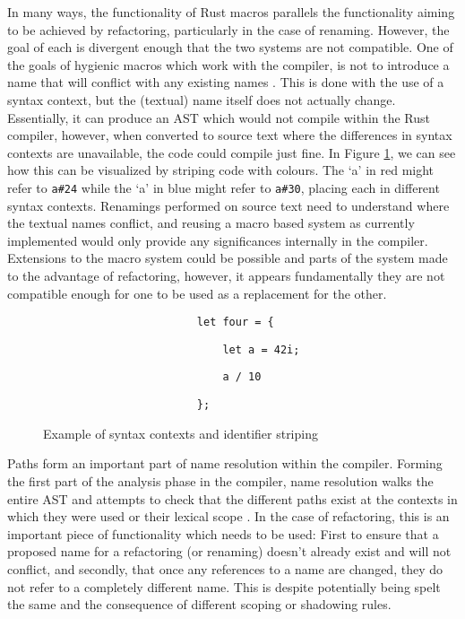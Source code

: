 In many ways, the functionality of Rust macros parallels the functionality aiming to be achieved by refactoring, particularly in the case of renaming. However, the goal of each is divergent enough that the two systems are not compatible. One of the goals of hygienic macros which work with the compiler, is not to introduce a name that will conflict with any existing names \cite{keep15}. This is done with the use of a syntax context, but the (textual) name itself does not actually change. Essentially, it can produce an AST which would not compile within the Rust compiler, however, when converted to source text where the differences in syntax contexts are unavailable, the code could compile just fine. In Figure \ref{Fig:striping}, we can see how this can be visualized by striping code with colours. The `a' in red might refer to {\verb|a#24|} while the `a' in blue might refer to {\verb|a#30|}, placing each in different syntax contexts. Renamings performed on source text need to understand where the textual names conflict, and reusing a macro based system as currently implemented would only provide any significances internally in the compiler. Extensions to the macro system could be possible and parts of the system made to the advantage of refactoring, however, it appears fundamentally they are not compatible enough for one to be used as a replacement for the other.

\begin{figure}[h]
{\color{blue}
\verb|                        let four = {|
}

{\color{red}

\verb|                            let a = 42i;|
}

{
\color{blue}

\verb|                            a / 10|
}

{\color{red}

\verb|                        };|
}

\caption{Example of syntax contexts and identifier striping}
\label{Fig:striping}
\end{figure}

Paths form an important part of name resolution within the compiler. Forming the first part of the analysis phase in the compiler, name resolution walks the entire AST and attempts to check that the different paths exist at the contexts in which they were used or their lexical scope \cite{driver15}. In the case of refactoring, this is an important piece of functionality which needs to be used: First to ensure that a proposed name for a refactoring (or renaming) doesn't already exist and will not conflict, and secondly, that once any references to a name are changed, they do not refer to a completely different name. This is despite potentially being spelt the same and the consequence of different scoping or shadowing rules.

